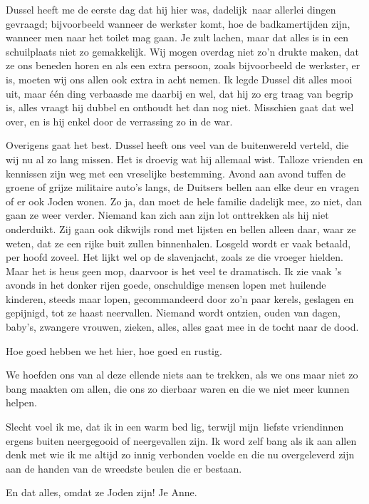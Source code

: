 \documentclass{book}
\begin{document}
Dussel heeft me de eerste dag dat hij hier was, dadelijk~naar allerlei
dingen gevraagd; bijvoorbeeld wanneer de werkster komt, hoe de
badkamertijden zijn, wanneer men naar het toilet mag gaan. Je zult
lachen, maar dat alles is in een schuilplaats niet zo gemakkelijk. Wij
mogen overdag niet zo'n drukte maken, dat ze ons beneden horen en als
een extra persoon, zoals bijvoorbeeld de werkster, er is, moeten wij ons
allen ook extra in acht nemen. Ik legde Dussel dit alles mooi uit, maar
één ding verbaasde me daarbij en wel, dat hij zo erg traag van begrip
is, alles vraagt hij dubbel en onthoudt het dan nog niet. Misschien gaat
dat wel over, en is hij enkel door de verrassing zo in de war.

Overigens gaat het best. Dussel heeft ons veel van de buitenwereld
verteld, die wij nu al zo lang missen. Het is droevig wat hij allemaal
wist. Talloze vrienden en kennissen zijn weg met een vreselijke
bestemming. Avond aan avond tuffen de groene of grijze militaire auto's
langs, de Duitsers bellen aan elke deur en vragen of er ook Joden wonen.
Zo ja, dan moet de hele familie dadelijk mee, zo niet, dan gaan ze weer
verder. Niemand kan zich aan zijn lot onttrekken als hij niet
onderduikt. Zij gaan ook dikwijls rond met lijsten en bellen alleen
daar, waar ze weten, dat ze een rijke buit zullen binnenhalen. Losgeld
wordt er vaak betaald, per hoofd zoveel. Het lijkt wel op de
slavenjacht, zoals ze die vroeger hielden. Maar het is heus geen mop,
daarvoor is het veel te dramatisch. Ik zie vaak 's avonds in het donker
rijen goede, onschuldige mensen lopen met huilende kinderen, steeds maar
lopen, gecommandeerd door zo'n paar kerels, geslagen en gepijnigd, tot
ze haast neervallen. Niemand wordt ontzien, ouden van dagen, baby's,
zwangere vrouwen, zieken, alles, alles gaat mee in de tocht naar de
dood.

Hoe goed hebben we het hier, hoe goed en rustig.

We hoefden ons van al deze ellende niets aan te trekken, als we ons maar
niet zo bang maakten om allen, die ons zo dierbaar waren en die we niet
meer kunnen helpen.

Slecht voel ik me, dat ik in een warm bed lig, terwijl mijn~liefste
vriendinnen ergens buiten neergegooid of neergevallen zijn. Ik word zelf
bang als ik aan allen denk met wie ik me altijd zo innig verbonden
voelde en die nu overgeleverd zijn aan de handen van de wreedste beulen
die er bestaan.

En dat alles, omdat ze Joden zijn! Je Anne.
\end{document}
